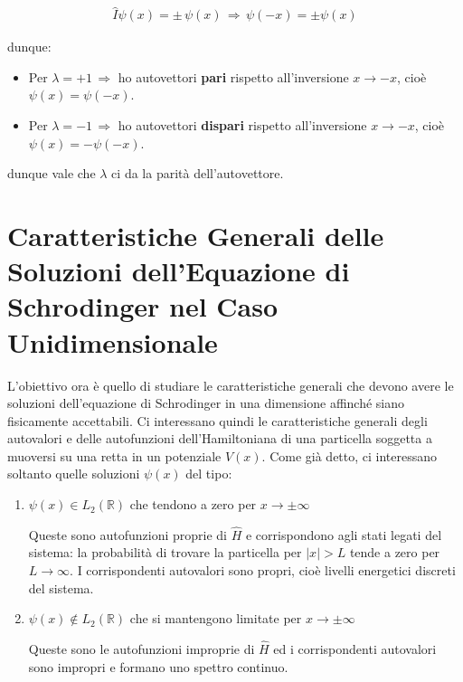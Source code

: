 \begin{align*}
	\hat{I} \psi(x) = \pm \, \psi(x) \, \Rightarrow \, \psi(-x) = \pm \psi(x)
\end{align*}
	
	dunque:
	
\begin{itemize}
	\item Per $\lambda = +1 \, \Rightarrow$ ho autovettori \textbf{pari} rispetto all'inversione $x \to -x$, cioè $\psi(x) = \psi(-x)$.
	\item Per $\lambda = -1 \, \Rightarrow$ ho autovettori \textbf{dispari} rispetto all'inversione $x \to -x$, cioè $\psi(x) = - \psi(-x)$.
\end{itemize}

	dunque vale che $\lambda$ ci da la parità dell'autovettore.

\section{Caratteristiche Generali delle Soluzioni dell’Equazione di
Schrodinger nel Caso Unidimensionale}

	L'obiettivo ora è quello di studiare le caratteristiche generali che devono avere le soluzioni dell'equazione di Schrodinger in una dimensione affinché siano fisicamente accettabili. Ci interessano quindi le caratteristiche generali degli autovalori e delle autofunzioni dell'Hamiltoniana di una particella soggetta a muoversi su una retta in un potenziale $V(x)$. Come già detto, ci interessano soltanto quelle soluzioni $\psi(x)$ del tipo:
	
\begin{enumerate}[label=\arabic*)]
	\item $\psi(x) \in L_2(\mathbb{R})$ che tendono a zero per $x \to \pm \infty$ 
		
		Queste sono autofunzioni proprie di $\hat{H}$ e corrispondono agli stati legati del sistema: la probabilità di trovare la particella per $|x| > L$ tende a zero per $L \to \infty$. I corrispondenti autovalori sono propri, cioè livelli energetici discreti del sistema.
		
	\item $\psi(x) \notin L_2(\mathbb{R})$ che si mantengono limitate per $x \to \pm \infty$
	
		Queste sono le autofunzioni improprie di $\hat{H}$ ed i corrispondenti autovalori sono impropri e formano uno spettro continuo.
\end{enumerate}

